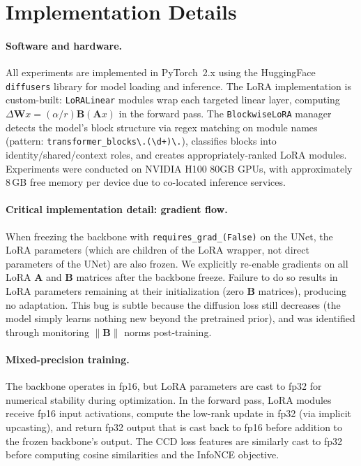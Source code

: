 \documentclass{article}
\begin{document}



\newpage
\appendix
\section{Implementation Details}
\label{app:implementation}

\paragraph{Software and hardware.}
All experiments are implemented in PyTorch~2.x using the HuggingFace \texttt{diffusers} library for model loading and inference.
The LoRA implementation is custom-built: \texttt{LoRALinear} modules wrap each targeted linear layer, computing $\Delta\mathbf{W}x = (\alpha/r)\mathbf{B}(\mathbf{A}x)$ in the forward pass.
The \texttt{BlockwiseLoRA} manager detects the model's block structure via regex matching on module names (pattern: \texttt{transformer\_blocks\textbackslash.(\textbackslash d+)\textbackslash.}), classifies blocks into identity/shared/context roles, and creates appropriately-ranked LoRA modules.
Experiments were conducted on NVIDIA H100 80GB GPUs, with approximately 8\,GB free memory per device due to co-located inference services.

\paragraph{Critical implementation detail: gradient flow.}
When freezing the backbone with \texttt{requires\_grad\_(False)} on the UNet, the LoRA parameters (which are children of the LoRA wrapper, not direct parameters of the UNet) are also frozen.
We explicitly re-enable gradients on all LoRA $\mathbf{A}$ and $\mathbf{B}$ matrices after the backbone freeze.
Failure to do so results in LoRA parameters remaining at their initialization (zero $\mathbf{B}$ matrices), producing no adaptation.
This bug is subtle because the diffusion loss still decreases (the model simply learns nothing new beyond the pretrained prior), and was identified through monitoring $\|\mathbf{B}\|$ norms post-training.

\paragraph{Mixed-precision training.}
The backbone operates in fp16, but LoRA parameters are cast to fp32 for numerical stability during optimization.
In the forward pass, LoRA modules receive fp16 input activations, compute the low-rank update in fp32 (via implicit upcasting), and return fp32 output that is cast back to fp16 before addition to the frozen backbone's output.
The CCD loss features are similarly cast to fp32 before computing cosine similarities and the InfoNCE objective.
\end{document}
